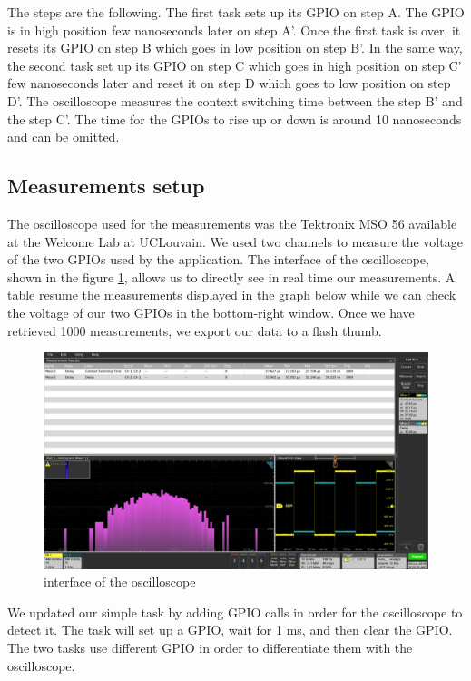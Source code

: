 The steps are the following.
The first task sets up its GPIO on step A.
The GPIO is in high position few nanoseconds later on step A'.
Once the first task is over, it resets its GPIO on step B which goes in low position on step B'.
In the same way, the second task set up its GPIO on step C which goes in high position on step C' few nanoseconds later and reset it on step D which goes to low position on step D'.
The oscilloscope measures the context switching time between the step B' and the step C'.
The time for the GPIOs to rise up or down is around 10 nanoseconds and can be omitted.


\subsection{Measurements setup\label{sec:measurement-setup}}

The oscilloscope used for the measurements was the Tektronix MSO 56\cite{mso56} available at the Welcome Lab at UCLouvain.
We used two channels to measure the voltage of the two GPIOs used by the application.
The interface of the oscilloscope, shown in the figure \ref{fig:oscilloscope-interface}, allows us to directly see in real time our measurements.
A table resume the measurements displayed in the graph below while we can check the voltage of our two GPIOs in the bottom-right window.
Once we have retrieved 1000 measurements, we export our data to a flash thumb.

\begin{figure}[!ht]
    \centering
    \includegraphics[scale=0.25]{assets/oscilloscope-interface.png}
    \caption{interface of the oscilloscope\label{fig:oscilloscope-interface}}
\end{figure}

We updated our simple task by adding GPIO calls in order for the oscilloscope to detect it.
The task will set up a GPIO, wait for 1 ms, and then clear the GPIO.
The two tasks use different GPIO in order to differentiate them with the oscilloscope.

